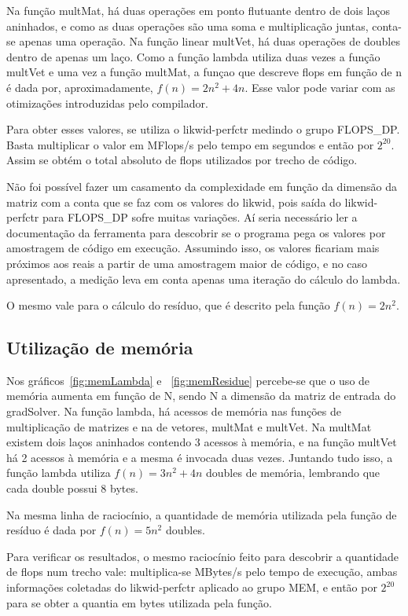 \documentclass[12pt]{article}
\begin{document}
Na função multMat, há duas operações em ponto flutuante dentro de dois laços
aninhados, e como as duas operações são uma soma e multiplicação juntas,
conta-se apenas uma operação. Na função linear multVet, há duas operações de
doubles dentro de apenas um laço. Como a função lambda utiliza duas vezes a
função multVet e uma vez a função multMat, a funçao que descreve flops em função
de n é dada por, aproximadamente, $f(n) = 2n^2 + 4n$. Esse valor pode variar com
as otimizações introduzidas pelo compilador.

Para obter esses valores, se utiliza o likwid-perfctr medindo o grupo FLOPS\_DP.
Basta multiplicar o valor em MFlops/s pelo tempo em segundos e então por
$2^{20}$. Assim se obtém o total absoluto de flops utilizados por trecho de
código.

Não foi possível fazer um casamento da complexidade em função da dimensão da
matriz com a conta que se faz com os valores do likwid, pois saída do
likwid-perfctr para FLOPS\_DP sofre muitas variações. Aí seria necessário ler a
documentação da ferramenta  para descobrir se o programa pega os valores por
amostragem de código em execução. Assumindo isso, os valores ficariam mais
próximos aos reais a partir de uma amostragem maior de código, e no caso
apresentado, a medição leva em conta apenas uma iteração do cálculo do lambda.

O mesmo vale para o cálculo do resíduo, que é descrito pela função $f(n) =
2n^2$.

\subsection{Utilização de memória}\label{sec:utilizacaoMemoria}

Nos gráficos~\ref{fig:memLambda} e ~\ref{fig:memResidue} percebe-se que o uso de
memória aumenta em função de N, sendo N a dimensão da matriz de entrada do
gradSolver. Na função lambda, há acessos de memória nas funções de multiplicação
de matrizes e na de vetores, multMat e multVet. Na multMat existem dois laços
aninhados contendo 3 acessos à memória, e na função multVet há 2 acessos à
memória e a mesma é invocada duas vezes. Juntando tudo isso, a função lambda
utiliza $f(n) = 3n^2 + 4n$ doubles de memória, lembrando que cada double possui
8 bytes.

Na mesma linha de raciocínio, a quantidade de memória utilizada pela função de
resíduo é dada por $f(n) = 5n^2$ doubles.

Para verificar os resultados, o mesmo raciocínio feito para descobrir a
quantidade de flops num trecho vale: multiplica-se MBytes/s pelo tempo de
execução, ambas informações coletadas do likwid-perfctr aplicado ao grupo MEM, e
então por $2^{20}$ para se obter a quantia em bytes utilizada pela função.
\end{document}
